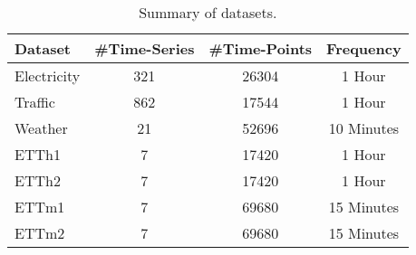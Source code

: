 \documentclass[10pt]{article} \usepackage[accepted]{tmlr}
\theoremstyle{plain}
\theoremstyle{definition}
\theoremstyle{remark}
\begin{document}
\begin{table}[ht!]
\centering
\begin{tabular}{l|c|c|c}
\toprule
Dataset & \#Time-Series & \#Time-Points & Frequency \\
\midrule
Electricity & 321 & 26304 & 1 Hour \\
Traffic & 862 & 17544 & 1 Hour \\
Weather & 21 & 52696 & 10 Minutes \\
ETTh1   & 7 & 17420 & 1 Hour \\
ETTh2   & 7 & 17420 & 1 Hour \\
ETTm1   & 7 & 69680 & 15 Minutes \\
ETTm2   & 7 & 69680 & 15 Minutes \\
\bottomrule
\end{tabular}
\caption{Summary of datasets.}
\label{tab:datasets}
\end{table}
\end{document}
